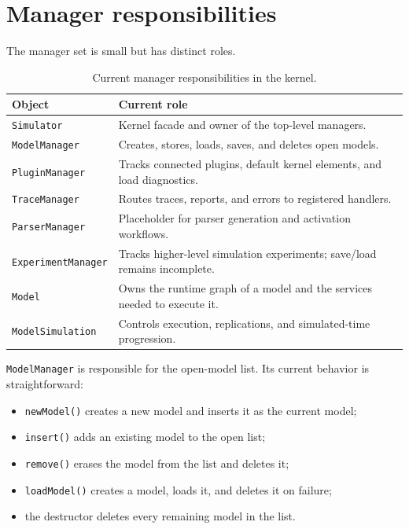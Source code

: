 \section{Manager responsibilities}
\label{sec:manager-responsibilities}

The manager set is small but has distinct roles.

\begin{table}[htbp]
\centering
\caption{Current manager responsibilities in the kernel.}
\label{tab:kernel-manager-responsibilities}
\small
\begin{tabular}{|p{3.2cm}|p{7.4cm}|}
\hline
\textbf{Object} & \textbf{Current role} \\
\hline
\texttt{Simulator} & Kernel facade and owner of the top-level managers. \\
\hline
\texttt{ModelManager} & Creates, stores, loads, saves, and deletes open models. \\
\hline
\texttt{PluginManager} & Tracks connected plugins, default kernel elements, and load diagnostics. \\
\hline
\texttt{TraceManager} & Routes traces, reports, and errors to registered handlers. \\
\hline
\texttt{ParserManager} & Placeholder for parser generation and activation workflows. \\
\hline
\texttt{ExperimentManager} & Tracks higher-level simulation experiments; save/load remains incomplete. \\
\hline
\texttt{Model} & Owns the runtime graph of a model and the services needed to execute it. \\
\hline
\texttt{ModelSimulation} & Controls execution, replications, and simulated-time progression. \\
\hline
\end{tabular}
\end{table}

\texttt{ModelManager} is responsible for the open-model list. Its current
behavior is straightforward:
\begin{itemize}
\item \texttt{newModel()} creates a new model and inserts it as the current
model;
\item \texttt{insert()} adds an existing model to the open list;
\item \texttt{remove()} erases the model from the list and deletes it;
\item \texttt{loadModel()} creates a model, loads it, and deletes it on failure;
\item the destructor deletes every remaining model in the list.
\end{itemize}

